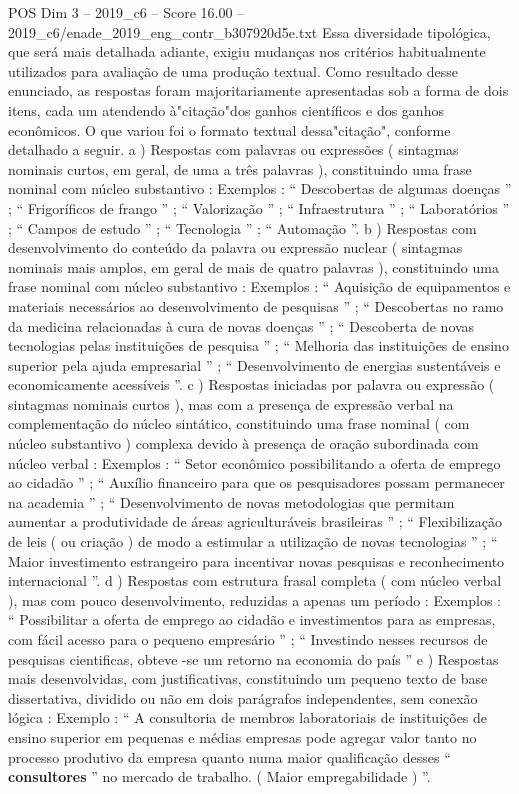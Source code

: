 \begin{textsample}{POS Dim 3 – 2019\_c6 – Score 16.00 – 2019\_c6/enade\_2019\_eng\_contr\_b307920d5e.txt}
Essa diversidade tipológica, que será mais detalhada adiante, exigiu mudanças nos critérios habitualmente utilizados para avaliação de uma produção textual.
Como resultado desse enunciado, as respostas foram majoritariamente apresentadas sob a forma de dois itens, cada um atendendo à"citação"dos ganhos científicos e dos ganhos econômicos.
O que variou foi o formato textual dessa"citação", conforme detalhado a seguir. a ) Respostas com palavras ou expressões ( sintagmas nominais curtos, em geral, de uma a três palavras ), constituindo uma frase nominal com núcleo substantivo : Exemplos : “ Descobertas de algumas doenças ” ; “ Frigoríficos de frango ” ; “ Valorização ” ; “ Infraestrutura ” ; “ Laboratórios ” ; “ Campos de estudo ” ; “ Tecnologia ” ; “ Automação ”. b ) Respostas com desenvolvimento do conteúdo da palavra ou expressão nuclear ( sintagmas nominais mais amplos, em geral de mais de quatro palavras ), constituindo uma frase nominal com núcleo substantivo : Exemplos : “ Aquisição de equipamentos e materiais necessários ao desenvolvimento de pesquisas ” ; “ Descobertas no ramo da medicina relacionadas à cura de novas doenças ” ; “ Descoberta de novas tecnologias pelas instituições de pesquisa ” ; “ Melhoria das instituições de ensino superior pela ajuda empresarial ” ; “ Desenvolvimento de energias sustentáveis e economicamente acessíveis ”. c ) Respostas iniciadas por palavra ou expressão ( sintagmas nominais curtos ), mas com a presença de expressão verbal na complementação do núcleo sintático, constituindo uma frase nominal ( com núcleo substantivo ) complexa devido à presença de oração subordinada com núcleo verbal : Exemplos : “ Setor econômico possibilitando a oferta de emprego ao cidadão ” ; “ Auxílio financeiro para que os pesquisadores possam permanecer na academia ” ; “ Desenvolvimento de novas metodologias que permitam aumentar a produtividade de áreas agriculturáveis brasileiras ” ; “ Flexibilização de leis ( ou criação ) de modo a estimular a utilização de novas tecnologias ” ; “ Maior investimento estrangeiro para incentivar novas pesquisas e reconhecimento internacional ”. d ) Respostas com estrutura frasal completa ( com núcleo verbal ), mas com pouco desenvolvimento, reduzidas a apenas um período : Exemplos : “ Possibilitar a oferta de emprego ao cidadão e investimentos para as empresas, com fácil acesso para o pequeno empresário ” ; “ Investindo nesses recursos de pesquisas cientificas, obteve -se um retorno na economia do país ” e ) Respostas mais desenvolvidas, com justificativas, constituindo um pequeno texto de base dissertativa, dividido ou não em dois parágrafos independentes, sem conexão lógica : Exemplo : “ A consultoria de membros laboratoriais de instituições de ensino superior em pequenas e médias empresas pode agregar valor tanto no processo produtivo da empresa quanto numa maior qualificação desses “ \textbf{consultores} ” no mercado de trabalho. ( Maior empregabilidade ) ”.

\end{textsample}
